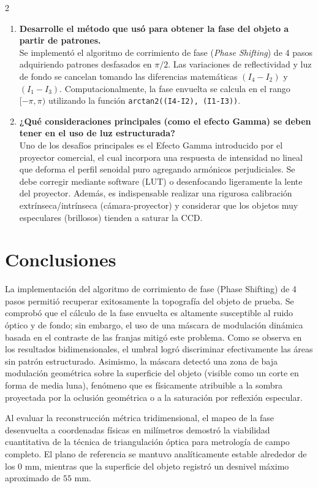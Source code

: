 \documentclass[letterpaper]{article}
\begin{document}
\begin{multicols}{2}
\begin{enumerate}
			\item \textbf{Desarrolle el método que usó para obtener la fase del objeto a partir de patrones.}\\
			Se implementó el algoritmo de corrimiento de fase (\textit{Phase Shifting}) de 4 pasos adquiriendo patrones desfasados en $\pi/2$. Las variaciones de reflectividad y luz de fondo se cancelan tomando las diferencias matemáticas $(I_4 - I_2)$ y $(I_1 - I_3)$. Computacionalmente, la fase envuelta se calcula en el rango $[-\pi, \pi)$ utilizando la función \texttt{arctan2((I4-I2), (I1-I3))}.
			
			\item \textbf{¿Qué consideraciones principales (como el efecto Gamma) se deben tener en el uso de luz estructurada?}\\
			Uno de los desafíos principales es el Efecto Gamma introducido por el proyector comercial, el cual incorpora una respuesta de intensidad no lineal que deforma el perfil senoidal puro agregando armónicos perjudiciales. Se debe corregir mediante software (LUT) o desenfocando ligeramente la lente del proyector. Además, es indispensable realizar una rigurosa calibración extrínseca/intrínseca (cámara-proyector) y considerar que los objetos muy especulares (brillosos) tienden a saturar la CCD.
		\end{enumerate}
		
		\section*{Conclusiones}
		La implementación del algoritmo de corrimiento de fase (Phase Shifting) de 4 pasos permitió recuperar exitosamente la topografía del objeto de prueba. Se comprobó que el cálculo de la fase envuelta es altamente susceptible al ruido óptico y de fondo; sin embargo, el uso de una máscara de modulación dinámica basada en el contraste de las franjas mitigó este problema. Como se observa en los resultados bidimensionales, el umbral logró discriminar efectivamente las áreas sin patrón estructurado. Asimismo, la máscara detectó una zona de baja modulación geométrica sobre la superficie del objeto (visible como un corte en forma de media luna), fenómeno que es físicamente atribuible a la sombra proyectada por la oclusión geométrica o a la saturación por reflexión especular.
		
		Al evaluar la reconstrucción métrica tridimensional, el mapeo de la fase desenvuelta a coordenadas físicas en milímetros demostró la viabilidad cuantitativa de la técnica de triangulación óptica para metrología de campo completo. El plano de referencia se mantuvo analíticamente estable alrededor de los $0\text{ mm}$, mientras que la superficie del objeto registró un desnivel máximo aproximado de $55\text{ mm}$. 
		

\end{multicols}
\end{document}
